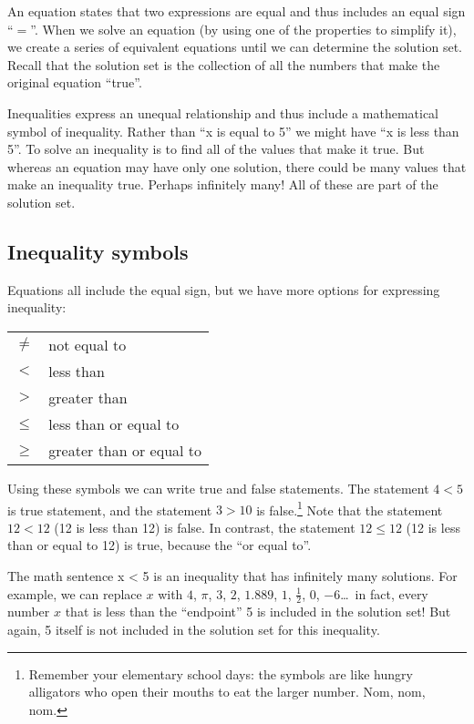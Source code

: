 An equation states that two expressions are equal and thus includes an equal sign ``$=$''. When we solve an equation (by using one of the properties to simplify it), we create a series of equivalent equations until we can determine the solution set. Recall that the solution set is the collection of all the numbers that make the original equation ``true''.

Inequalities express an unequal relationship and thus include a mathematical symbol of inequality. Rather than ``x is equal to 5'' we might have ``x is less than 5''. To solve an inequality is to find all of the values that make it true. But whereas an equation may have only one solution, there could be many values that make an inequality true. Perhaps infinitely many! All of these are part of the solution set. 

\subsection{Inequality symbols}

Equations all include the equal sign, but we have more options for expressing inequality:

\begin{center}
\begin{tabular}{cl}
$\neq$	& not equal to\\
$<$	& less than\\
$>$	& greater than\\
$\leq$	& less than or equal to\\
$\geq$	& greater than or equal to
\end{tabular}
\end{center}

Using these symbols we can write true and false statements. The statement $4<5$ is true statement, and the statement $3>10$ is false.\footnote{Remember your elementary school days: the symbols are like hungry alligators who open their mouths to eat the larger number. Nom, nom, nom.} Note that the statement $12<12$ (12 is less than 12) is false. In contrast, the statement $12 \leq 12$ (12 is less than or equal to 12) is true, because the ``or equal to''.

The math sentence x < 5 is an inequality that has infinitely many solutions. For example, we can replace $x$ with $4$, $\pi$, $3$, $2$, $1.889$, $1$, $\frac{1}{2}$, $0$, $-6$\ldots\ in fact, every number $x$ that is less than the ``endpoint'' 5 is included in the solution set! But again, 5 itself is not included in the solution set for this inequality.

